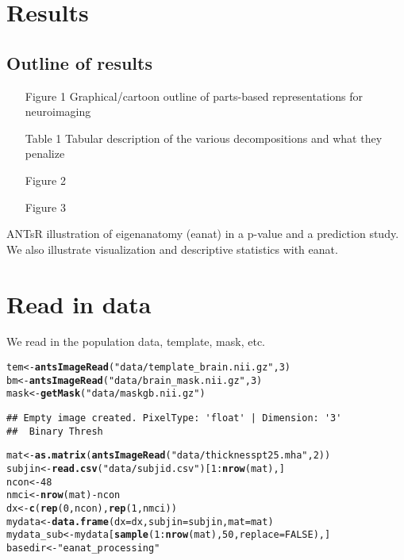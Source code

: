 \documentclass{elsarticle}\usepackage{graphicx, color}
\makeatletter
\newcommand{\hlfunctioncall}[1]{\textcolor[rgb]{0.501960784313725,0,0.329411764705882}{\textbf{#1}}}%
\newcommand{\hlstring}[1]{\textcolor[rgb]{0.6,0.6,1}{#1}}%
\newenvironment{kframe}{%
 \def\at@end@of@kframe{}%
 \ifinner\ifhmode%
  \def\at@end@of@kframe{\end{minipage}}%
  \begin{minipage}{\columnwidth}%
 \fi\fi%
 \def\FrameCommand##1{\hskip\@totalleftmargin \hskip-\fboxsep
 \colorbox{shadecolor}{##1}\hskip-\fboxsep
     \hskip-\linewidth \hskip-\@totalleftmargin \hskip\columnwidth}%
 \MakeFramed {\advance\hsize-\width
   \@totalleftmargin\z@ \linewidth\hsize
   \@setminipage}}%
 {\par\unskip\endMakeFramed%
 \at@end@of@kframe}
\newenvironment{knitrout}{}{} %
\makeatother
\begin{document}
\section{Results}

\subsection{Outline of results}
\begin{enumerate}
  \item[Figure 1] Graphical/cartoon outline of parts-based representations for neuroimaging   
  \item[Table 1] Tabular description of the various decompositions and what they penalize
  \item[Figure 2]  
  \item[Figure 3]
\end{enumerate}

ANTsR illustration of eigenanatomy (eanat) in a p-value and a prediction study.  We also illustrate visualization and descriptive statistics with eanat.



\section{Read in data}

We read in the population data, template, mask, etc.

\begin{knitrout}
\color{fgcolor}\begin{kframe}
\begin{alltt}
tem <- \hlfunctioncall{antsImageRead}(\hlstring{"data/template_brain.nii.gz"}, 3)
bm <- \hlfunctioncall{antsImageRead}(\hlstring{"data/brain_mask.nii.gz"}, 3)
mask <- \hlfunctioncall{getMask}(\hlstring{"data/maskgb.nii.gz"})
\end{alltt}
\begin{verbatim}
## Empty image created. PixelType: 'float' | Dimension: '3'
##  Binary Thresh
\end{verbatim}
\begin{alltt}
mat <- \hlfunctioncall{as.matrix}(\hlfunctioncall{antsImageRead}(\hlstring{"data/thicknesspt25.mha"}, 2))
subjin <- \hlfunctioncall{read.csv}(\hlstring{"data/subjid.csv"})[1:\hlfunctioncall{nrow}(mat), ]
ncon <- 48
nmci <- \hlfunctioncall{nrow}(mat) - ncon
dx <- \hlfunctioncall{c}(\hlfunctioncall{rep}(0, ncon), \hlfunctioncall{rep}(1, nmci))
mydata <- \hlfunctioncall{data.frame}(dx = dx, subjin = subjin, mat = mat)
mydata_sub <- mydata[\hlfunctioncall{sample}(1:\hlfunctioncall{nrow}(mat), 50, replace = FALSE), ]
basedir <- \hlstring{"eanat_processing"}
\end{alltt}
\end{kframe}
\end{knitrout}
\end{document}
